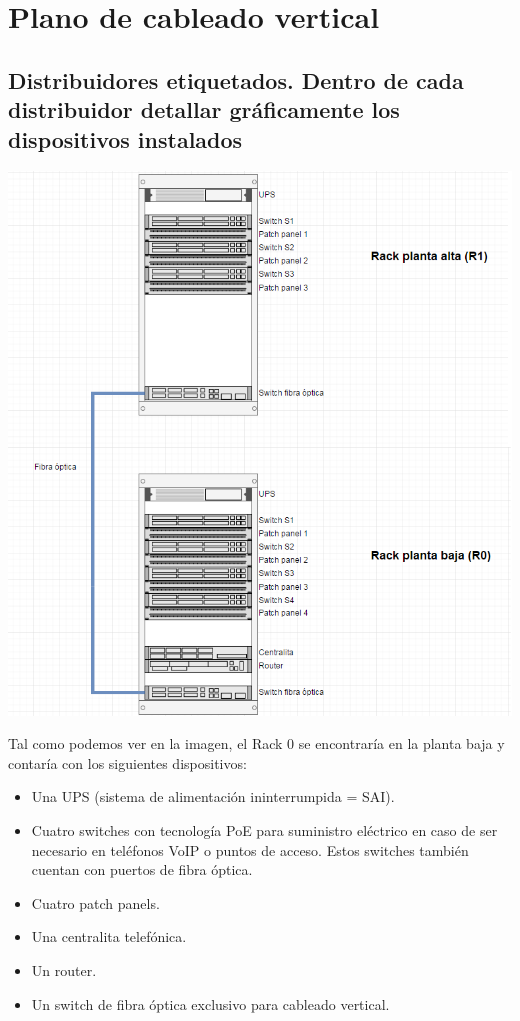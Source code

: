 \chapter{Plano de cableado vertical}
\section{Distribuidores etiquetados. Dentro de cada distribuidor detallar gráficamente los dispositivos instalados}
\begin{center}
	\includegraphics[scale=0.65]{CV.png}
\end{center}
\newpage
Tal como podemos ver en la imagen, el Rack 0 se encontraría en la planta baja y contaría con los siguientes dispositivos:
\begin{itemize}
	\item Una UPS (sistema de alimentación ininterrumpida = SAI).
	\item Cuatro switches con tecnología PoE para suministro eléctrico en caso de ser necesario en teléfonos VoIP o puntos de acceso. Estos switches también cuentan con puertos de fibra óptica.
	\item Cuatro patch panels.
	\item Una centralita telefónica.
	\item Un router.
	\item Un switch de fibra óptica exclusivo para cableado vertical.
\end{itemize}
